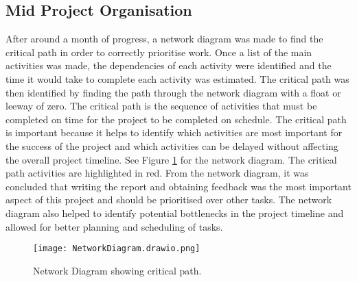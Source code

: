 \subsection{Mid Project Organisation}

After around a month of progress, a network diagram was made to find the critical path in order to correctly prioritise work. Once a list of the main activities was made, the dependencies of each activity were identified and the time it would take to complete each activity was estimated. The critical path was then identified by finding the path through the network diagram with a float or leeway of zero. The critical path is the sequence of activities that must be completed on time for the project to be completed on schedule. The critical path is important because it helps to identify which activities are most important for the success of the project and which activities can be delayed without affecting the overall project timeline. See Figure \ref{figure:network-diagram} for the network diagram. The critical path activities are highlighted in red. From the network diagram, it was concluded that writing the report and obtaining feedback was the most important aspect of this project and should be prioritised over other tasks. The network diagram also helped to identify potential bottlenecks in the project timeline and allowed for better planning and scheduling of tasks.

\begin{figure}[h!!]
  \begin{center}
    \texttt{[image: NetworkDiagram.drawio.png]}
    \caption{Network Diagram showing critical path.}
    \label{figure:network-diagram}
  \end{center}
\end{figure}